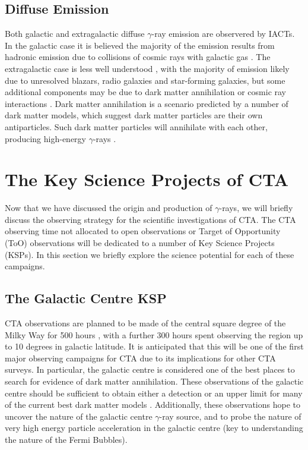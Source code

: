 \subsection{Diffuse Emission}
Both galactic and extragalactic diffuse $\gamma$-ray emission are observered by IACTs. In the galactic case it is believed the majority of the emission results from hadronic emission due to collisions of cosmic rays with galactic gas \cite{extragamma}. The extragalactic case is less well understood \cite{extragamma}, with the majority of emission likely due to unresolved blazars, radio galaxies and star-forming galaxies, but some additional components may be due to dark matter annihilation or cosmic ray interactions \cite{extragamma}. Dark matter annihilation is a scenario predicted by a number of dark matter models, which suggest dark matter particles are their own antiparticles. Such dark matter particles will annihilate with each other, producing high-energy $\gamma$-rays \cite{scienceCTA}.

\section{The Key Science Projects of CTA}
Now that we have discussed the origin and production of $\gamma$-rays, we will briefly discuss the observing strategy for the scientific investigations of CTA. The CTA observing time not allocated to open observations or Target of Opportunity (ToO) observations will be dedicated to a number of Key Science Projects (KSPs). In this section we briefly explore the science potential for each of these campaigns.

\subsection{The Galactic Centre KSP}
CTA observations are planned to be made of the central square degree of the Milky Way for 500 hours \cite{scienceCTA}, with a further 300 hours spent observing the region up to 10 degrees in galactic latitude. It is anticipated that this will be one of the first major observing campaigns for CTA due to its implications for other CTA surveys. In particular, the galactic centre is considered one of the best places to search for evidence of dark matter annihilation. These observations of the galactic centre should be sufficient to obtain either a detection or an upper limit for many of the current best dark matter models \cite{scienceCTA}. Additionally, these observations hope to uncover the nature of the galactic centre $\gamma$-ray source, and to probe the nature of very high energy particle acceleration in the galactic centre (key to understanding the nature of the Fermi Bubbles). 

